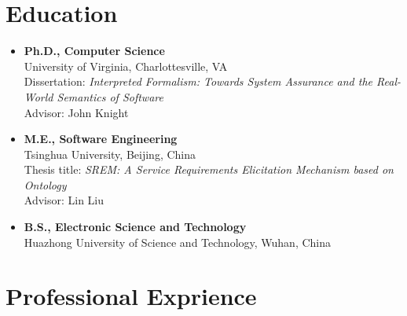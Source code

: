 \documentclass[11pt]{article}
\begin{document}



%





\section{Education}

\begin{itemize}
  \item \textbf{Ph.D., Computer Science} \\
University of Virginia, Charlottesville, VA \\
Dissertation: \emph{Interpreted Formalism: Towards System Assurance and the Real-World Semantics of Software}\\
Advisor: John Knight   
\item \textbf{M.E., Software Engineering} \\
Tsinghua University, Beijing, China\\
Thesis title: \emph{SREM: A Service Requirements Elicitation Mechanism based on Ontology} \\
Advisor: Lin Liu 

\item \textbf{B.S., Electronic Science and Technology} \\
Huazhong University of Science and Technology, Wuhan, China
\end{itemize}



\section{Professional Exprience}
\end{document}
